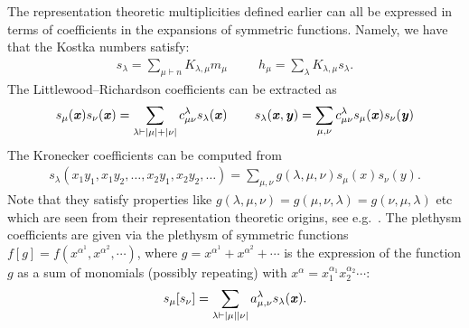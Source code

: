 \documentclass[11pt]{amsart}
\theoremstyle{plain}
\theoremstyle{definition}
\numberwithin{equation}{section}
\def\bx{{\textbf{\textit{x}}}}
\def\by{{\textbf{\textit{y}}}}
\newcommand{\la}{\lambda}
\newcommand{\al}{\alpha}
\def\la{\lambda}
\begin{document}
The representation theoretic multiplicities defined earlier can all be expressed in terms of coefficients in the expansions of symmetric functions. Namely, we have that the Kostka numbers satisfy:
\begin{align}
s_\la = \sum_{\mu \vdash n} K_{\la,\mu} m_\mu\, \; \qquad h_{\mu} = \sum_\la K_{\la,\mu} s_\la.
\end{align}
The Littlewood--Richardson coefficients can be extracted as
\begin{align}
s_\mu(\bx) s_\nu(\bx) = \sum_{\la \vdash |\mu|+|\nu|} c^\la_{\mu\nu} s_\la(\bx) \, \qquad s_\la(\bx,\by) = \sum_{\mu,\nu} c^\la_{\mu\nu} s_\mu(\bx) s_\nu(\by) 
\end{align}
The Kronecker coefficients can be computed from
\begin{align}\label{eq:kron_def}
s_\la(x_1y_1,x_1y_2,\ldots,x_2y_1,x_2y_2,\ldots) = \sum_{\mu,\nu} g(\la,\mu,\nu) s_\mu(x) s_\nu(y).
\end{align}
Note that they satisfy properties like $g(\la,\mu,\nu) = g(\mu,\nu,\la) = g(\nu,\mu,\la)$ etc which are seen from their representation theoretic origins, see e.g.~\cite{S1}.
The plethysm coefficients are given via the plethysm of symmetric functions $f[g]=f(x^{\al^1},x^{\al^2},\cdots)$, where $g=x^{\al^1}+x^{\al^2}+\cdots$ is the expression of the function $g$ as a sum of monomials (possibly repeating) with $x^\alpha = x_1^{\alpha_1}x_2^{\alpha_2}\cdots$:
\begin{align}\label{eq:pleth_def}
s_\mu[s_\nu] = \sum_{\la \vdash |\mu| |\nu|} a^\la_{\mu,\nu} s_\la(\bx).
\end{align}
%
\end{document}

